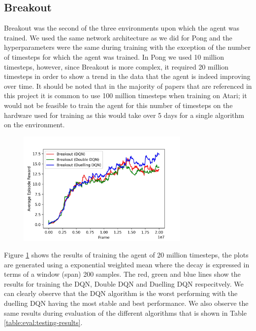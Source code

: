 \subsection{Breakout}
Breakout was the second of the three environments upon which the agent was trained. We used the same network architecture as we did for Pong and the hyperparameters were the same during training with the exception of the number of timesteps for which the agent was trained. In Pong we used 10 million timesteps, however, since Breakout is more complex, it required 20 million timesteps in order to show a trend in the data that the agent is indeed improving over time. It should be noted that in the majority of papers that are referenced in this project it is common to use 100 million timesteps when training on Atari; it would not be feasible to train the agent for this number of timesteps on the hardware used for training as this would take over 5 days for a single algorithm on the environment.

\begin{figure}[htbp]
  \centering
  \includegraphics[width=0.75\textwidth]{chapters/chapter5/images/breakout_plot.jpg}
  \caption[Breakout Training results]{
    \label{fig:breakout-train-results}
  }
\end{figure}

Figure \ref{fig:breakout-train-results} shows the results of training the agent of 20 million timesteps, the plots are generated using a exponential weighted mean where the decay is expressed in terms of a window (span) 200 samples. The red, green and blue lines show the results for training the DQN, Double DQN and Duelling DQN respecitvely. We can clearly observe that the DQN algorithm is the worst performing with the duelling DQN having the most stable and best performance. We also observe the same results during evaluation of the different algorithms that is shown in Table \ref{table:eval:testing-results}.

